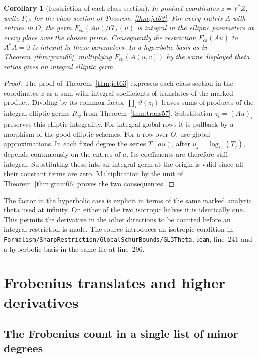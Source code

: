 \documentclass[a4paper,11pt]{article}
\newtheorem{corollary}[proposition]{Corollary}
\theoremstyle{definition}
\theoremstyle{remark}
\newcommand{\srcloc}[2]{{\small\nolinkurl{#1.lean}}, line~#2}
\numberwithin{equation}{section}
\begin{document}
\begin{corollary}[Restriction of each class section]\label{cor:class66}
In product coordinates \(z=V^*Z\), write \(F_{ch}\) for the
class section of Theorem~\ref{thm:jet63}. For every matrix \(A\)
with entries in \(O\), the germ \(F_{ch}(Au)/G_A(u)\) is integral
in the elliptic parameters at every place over the chosen prime.
Consequently the restriction \(F_{ch}(Au)\) to \(A^*A=0\) is
integral in those parameters. In a hyperbolic basis as in
Theorem~\ref{thm:gram66}, multiplying \(F_{ch}(A(u,v))\) by
the same displayed theta ratios gives an integral elliptic germ.
\end{corollary}
\begin{proof}
The proof of Theorem~\ref{thm:jet63} expresses each class section
in the coordinates \(z\) as a sum with integral coefficients
of translates of the marked product. Dividing by its common
factor \(\prod_i\vartheta(z_i)\) leaves sums of products of the
integral elliptic germs \(R_w\) from Theorem~\ref{thm:trans57}.
Substitution \(z_i=(Au)_i\) preserves this elliptic integrality.
For integral global rows it is pullback by a morphism of the good
elliptic schemes. For a row over \(O\), use global approximations.
In each fixed degree the series \(T(a u)\), after
\(u_j=\log_C(T_j)\), depends continuously on the entries of
\(a\). Its coefficients are therefore still integral.
Substituting these into an integral germ at the origin is valid
since all their constant terms are zero. Multiplication by the
unit of Theorem~\ref{thm:gram66} proves the two consequences.
\end{proof}

The factor in the hyperbolic case is explicit in terms of the
same marked analytic theta used at infinity. On either of the two
isotropic halves it is identically one. This permits the derivative
in the other directions to be counted before an integral restriction
is made. The source introduces an isotropic condition in
\srcloc{Formalism/SharpRestriction/GlobalSchurBounds/GL3Theta}{241}
and a hyperbolic basis in the same file at line~296.

\section{Frobenius translates and higher derivatives}\label{nav:g-V-2}

\subsection{The Frobenius count in a single list of minor degrees}\label{nav:V-17}
\label{sec:count73}
\end{document}
